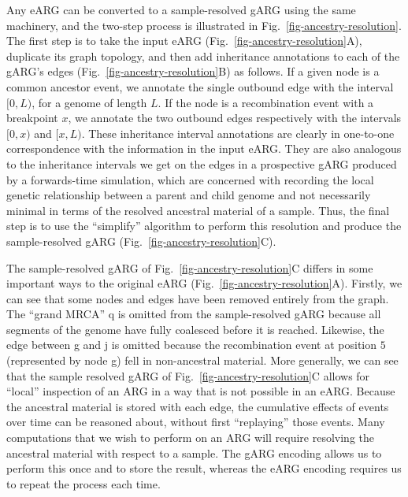 \documentclass{article}
\newcommand{\noderef}[1]{\textsf{#1}}
\begin{document}
Any eARG can be converted to a sample-resolved gARG using the same machinery,
and the two-step process is illustrated in Fig.~\ref{fig-ancestry-resolution}.
The first step is to take the input eARG (Fig.~\ref{fig-ancestry-resolution}A),
duplicate its graph topology, and then add inheritance annotations
to each of the gARG's edges (Fig.~\ref{fig-ancestry-resolution}B) as follows.
If a given node is a common ancestor event, we annotate the single
outbound edge with the interval $[0,L)$, for a genome of length $L$. If the
node is a recombination event with a breakpoint $x$, we annotate the two
outbound edges respectively with the intervals $[0, x)$ and $[x, L)$. These
inheritance interval annotations are clearly in one-to-one correspondence with
the information in the input eARG. They are also analogous to the
inheritance intervals we get on the edges in a prospective gARG
produced by a forwards-time simulation, which are concerned with recording
the local genetic relationship between a parent and child genome and not
necessarily minimal in terms of the resolved ancestral material of a sample.
Thus, the final step is to use the ``simplify'' algorithm to perform this
resolution and produce the sample-resolved
gARG (Fig.~\ref{fig-ancestry-resolution}C).

The sample-resolved gARG of Fig.~\ref{fig-ancestry-resolution}C
differs in some important ways to the
original eARG (Fig.~\ref{fig-ancestry-resolution}A).
Firstly, we can see that some nodes and edges have been removed entirely
from the graph.
The ``grand MRCA'' \noderef{q} is omitted from the
sample-resolved gARG because all segments of the genome have
fully coalesced before it is reached. Likewise, the edge
between \noderef{g} and \noderef{j} is omitted because the recombination
event at position $5$ (represented by node \noderef{g})
fell in non-ancestral material.
More generally, we can see that the sample resolved
gARG of Fig.~\ref{fig-ancestry-resolution}C
allows for ``local'' inspection
of an ARG in a way that is not possible in an eARG.
Because the ancestral material is stored with each edge, the
cumulative effects of events over time can be reasoned
about, without first ``replaying'' those events.
Many computations
that we wish to perform on an ARG will require resolving
the ancestral material with respect to a sample.
The gARG encoding
allows us to perform this once
and to store the result,
whereas the eARG encoding requires us to repeat the process
each time.
\end{document}
